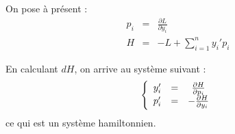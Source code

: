 On pose à présent : \begin{eqnarray*}
	p_i&=&\frac{\partial L}{\partial y_i}\\
	H&=&-L+\sum_{i=1}^n y_i'p_i
\end{eqnarray*}

En calculant $dH$, on arrive au système suivant : \[\left\{ \begin{array}{c c c}
	y_i'&=&\frac{\partial H}{\partial p_i}\\
	p_i'&=&-\frac{\partial H}{\partial y_i}
\end{array} \right.\]
ce qui est un système hamiltonnien.
